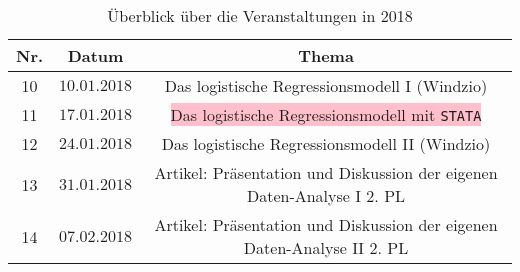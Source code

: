 \documentclass[a4paper,fontsize=14pt]{article}
\begin{document}
 \begin{table}[h]
\begin{center}
\caption{Überblick über die Veranstaltungen in 2018}
  \begin{tabular}{|c|c|c|}
    \hline
    Nr. & Datum & Thema \\ \hline
    10 &   $10.01.2018$   &   \colorbox{yellow!60}{ Das logistische Regressionsmodell I (Windzio)} \\ \hline
    11 &   $17.01.2018$   &   \colorbox{pink}{ Das logistische Regressionsmodell mit \texttt{STATA}}  \\ \hline
    12 &   $24.01.2018$  &   \colorbox{yellow!60}{ Das logistische Regressionsmodell II (Windzio)}\\ \hline
    13 &   $31.01.2018$   &   \colorbox{green!50}{Artikel: Präsentation und Diskussion der eigenen Daten-Analyse I} \colorbox{red!70}{2. PL}\\ \hline
    14 &   $07.02.2018$   &    \colorbox{green!50}{Artikel: Präsentation und Diskussion der eigenen Daten-Analyse II} \colorbox{red!70}{2. PL}\\ \hline
\end{tabular}
  \end{center}
  \label{tab:multicol}
 \end{table}
\end{document}
